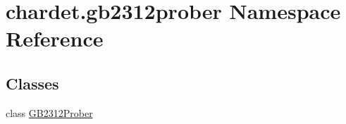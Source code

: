 \hypertarget{namespacechardet_1_1gb2312prober}{}\section{chardet.\+gb2312prober Namespace Reference}
\label{namespacechardet_1_1gb2312prober}
\subsection*{Classes}
\begin{DoxyCompactItemize}
\item 
class \hyperlink{classchardet_1_1gb2312prober_1_1_g_b2312_prober}{G\+B2312\+Prober}
\end{DoxyCompactItemize}
